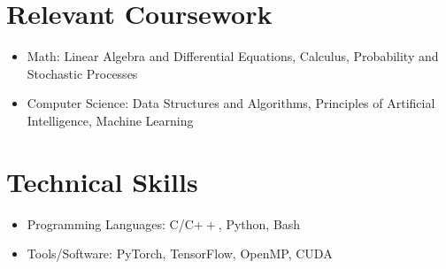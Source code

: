 \documentclass{article}
\begin{document}
\begin{enumerate}
%

\end{enumerate}

\section*{Relevant Coursework}
\begin{itemize}[noitemsep,nolistsep]
\item
    Math: Linear Algebra and Differential Equations, Calculus, Probability and
        Stochastic Processes
\item
    Computer Science: Data Structures and Algorithms, Principles of Artificial Intelligence, Machine Learning
\end{itemize}

\section*{Technical Skills}
\begin{itemize}[noitemsep,nolistsep]
\item
    Programming Languages: C/C$++$, Python, Bash
\item
    Tools/Software: PyTorch, TensorFlow, OpenMP, CUDA
\end{itemize}

\end{document}
